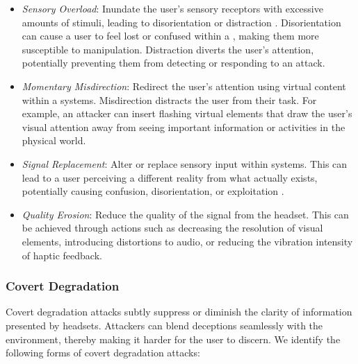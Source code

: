      \begin{itemize}
     \itemsep0em
     \item 
     \emph{Sensory Overload}: Inundate the user's sensory receptors with excessive amounts of stimuli, leading to disorientation or distraction \cite{Roesner2011Security, odeleye2021detecting}. 
     Disorientation can cause a user to feel lost or confused within a \VE, making them more susceptible to manipulation. 
     Distraction diverts the user's attention, potentially preventing them from detecting or responding to an attack.
     
     \item \emph{Momentary Misdirection}: Redirect the user's attention using virtual content within a \MR systems. Misdirection distracts the user from their task. For example, an attacker can insert flashing virtual elements that draw the user's visual attention away from seeing important information or activities in the physical world.
     
     \item  \emph{Signal Replacement}: Alter or replace sensory input within \MR systems. This can lead to a user perceiving a different reality from what actually exists, potentially causing confusion, disorientation, or exploitation \cite{Tseng_2022}.
     
     \item  \emph{Quality Erosion}: Reduce the quality of the signal from the \MR headset. This can be achieved through actions such as decreasing the resolution of visual elements, introducing distortions to audio, or reducing the vibration intensity of haptic feedback.
     \end{itemize} 





\subsubsection{Covert Degradation}
      Covert degradation attacks subtly suppress or diminish the clarity of information presented by \MR headsets.
      Attackers can blend deceptions seamlessly with the \MR environment, thereby making it harder for the user to discern.
      We identify the following forms of covert degradation attacks:
      
